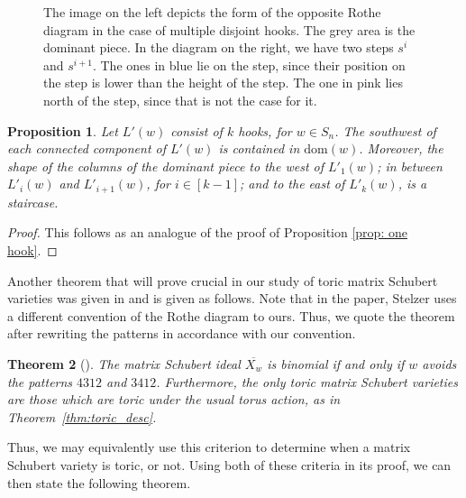 \documentclass[11pt]{amsart}
\newtheorem{theorem}{Theorem}[section]
\newtheorem{proposition}[theorem]{Proposition}
\theoremstyle{definition}
\theoremstyle{definition}
\theoremstyle{definition}
\theoremstyle{definition}
\newcommand{\Xw}{\overline{X_w}}
\newcommand{\dom}{\mathrm{dom}}
\begin{document}
\begin{figure}[H]
\begin{minipage}{0.49\textwidth}
\end{minipage}
\caption{The image on the left depicts the form of the opposite Rothe diagram in the case of multiple disjoint hooks. 
The grey area is the dominant piece. 
In the diagram on the right, we have two steps $s^i$ and $s^{i+1}$. The ones in blue lie on the step, since their position on the step is lower than the height of the step. The one in pink lies north of the step, since that is not the case for it.}
\end{figure}



\begin{proposition}
    Let $L'(w)$ consist of $k$ hooks, for $w \in S_n$. The southwest of each connected component of $L'(w)$ is contained in $\dom(w)$. Moreover, the shape of the columns of the dominant piece to the west of $L'_1(w)$; in between $L'_i(w)$ and $L'_{i+1}(w)$, for $i\in[k-1]$; and to the east of $L'_k(w)$, is a staircase. 
\end{proposition}

\begin{proof}
    This follows as an analogue of the proof of Proposition \ref{prop: one hook}.
\end{proof}

 \noindent Another theorem that will prove crucial in our study of toric matrix Schubert varieties was given in \cite{stelzer2025matrix} and is given as follows. Note that in the paper, Stelzer uses a different convention of the Rothe diagram to ours. Thus, we quote the theorem after rewriting the patterns in accordance with our convention. 

\begin{theorem}[{\cite[Theorem 1.6]{stelzer2025matrix}}]\label{thm: pattern avoidance}
    The matrix Schubert ideal $\Xw$ is binomial if and only if $w$ avoids the patterns $4312$ and $3412$. Furthermore, the only toric matrix Schubert varieties are those which are toric under the usual torus action, as in Theorem~\ref{thm:toric_desc}.
\end{theorem}
\noindent Thus, we may equivalently use this criterion to determine when a matrix Schubert variety is toric, or not. Using both of these criteria in its proof, we can then state the following theorem. 
\end{document}
